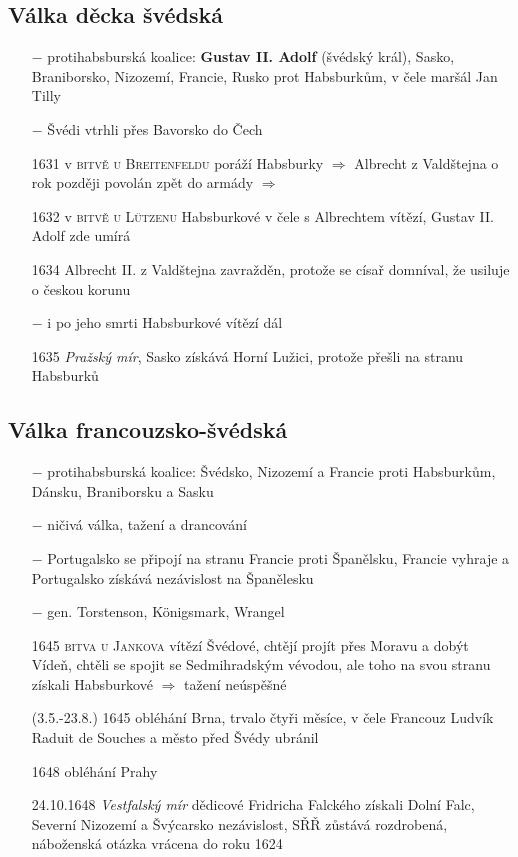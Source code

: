 \documentclass{article}
\begin{document}
\subsection*{Válka děcka švédská}
\begin{itemize}
    \vspace{-0.5em}
    \setlength\itemsep{0.15em}
    \item[$-$] protihabsburská koalice: \textbf{Gustav II. Adolf} (švédský král), Sasko, Braniborsko, Nizozemí, Francie, Rusko prot Habsburkům, v čele maršál Jan Tilly
    \item[$-$] Švédi vtrhli přes Bavorsko do Čech
    \item[1631] v \textsc{bitvě u Breitenfeldu} poráží Habsburky $\Rightarrow$ Albrecht z Valdštejna o rok později povolán zpět do armády $\Rightarrow$
    \item[1632] v  \textsc{bitvě u Lützenu} Habsburkové v čele s Albrechtem vítězí, Gustav II. Adolf zde umírá
    \item[1634] Albrecht II. z Valdštejna zavražděn, protože se císař domníval, že usiluje o českou korunu
    \item[$-$] i po jeho smrti Habsburkové vítězí dál
    \item[1635] \textit{Pražský mír}, Sasko získává Horní Lužici, protože přešli na stranu Habsburků
\end{itemize}

\subsection*{Válka francouzsko-švédská}
\begin{itemize}
    \vspace{-0.5em}
    \setlength\itemsep{0.15em}
    \item[$-$] protihabsburská koalice: Švédsko, Nizozemí a Francie proti Habsburkům, Dánsku, Braniborsku a Sasku
    \item[$-$] ničivá válka, tažení a drancování
    \item[$-$] Portugalsko se připojí na stranu Francie proti Španělsku, Francie vyhraje a Portugalsko získává nezávislost na Španělesku
    \item[$-$] gen. Torstenson, Königsmark, Wrangel
    \item[1645] \textsc{bitva u Jankova} vítězí Švédové, chtějí projít přes Moravu a dobýt Vídeň, chtěli se spojit se Sedmihradským vévodou, ale toho na svou stranu získali Habsburkové $\Rightarrow$ tažení neúspěšné
    \item[(3.5.-23.8.) 1645] obléhání Brna, trvalo čtyři měsíce, v čele Francouz Ludvík Raduit de Souches a město před Švédy ubránil
    \item[1648] obléhání Prahy
    \item[24.10.1648] \textit{Vestfalský mír} dědicové Fridricha Falckého získali Dolní Falc, Severní Nizozemí a Švýcarsko nezávislost, SŘŘ zůstává rozdrobená, náboženská otázka vrácena do roku 1624
\end{itemize}
\end{document}

